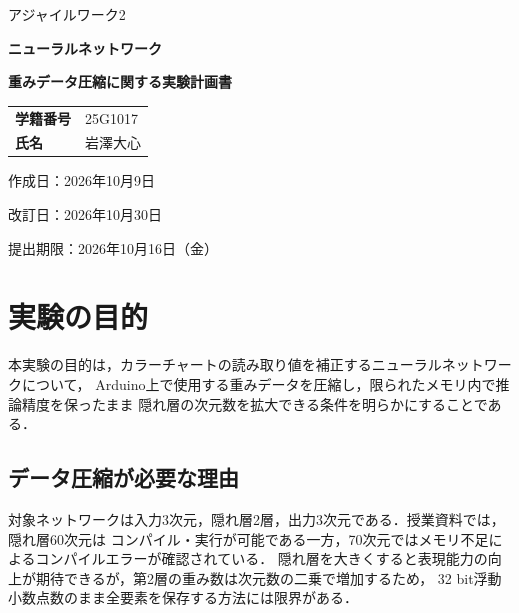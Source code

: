 \documentclass[a4paper,11pt]{article}
\newcommand{\StudentID}{25G1017}
\newcommand{\StudentName}{岩澤大心}
\begin{document}
\hypersetup{pageanchor=false}
\begin{titlepage}
  \centering
  \vspace*{22mm}
  {\Large アジャイルワーク2\par}
  \vspace{12mm}
  {\Huge\bfseries ニューラルネットワーク\par}
  \vspace{3mm}
  {\Huge\bfseries 重みデータ圧縮に関する実験計画書\par}
  \vspace{25mm}

  \begin{tabular}{>{\bfseries}p{38mm}p{90mm}}
    学籍番号 & \StudentID \\
    氏名     & \StudentName \\
  \end{tabular}

  \vfill
  {\large 作成日：2026年10月9日\par}
  \vspace{2mm}
  {\large 改訂日：2026年10月30日\par}
  \vspace{2mm}
  {\large 提出期限：2026年10月16日（金）\par}
\end{titlepage}

\hypersetup{pageanchor=true}
\tableofcontents
\clearpage
{}

\section{実験の目的}

本実験の目的は，カラーチャートの読み取り値を補正するニューラルネットワークについて，
Arduino上で使用する重みデータを圧縮し，限られたメモリ内で推論精度を保ったまま
隠れ層の次元数を拡大できる条件を明らかにすることである．

\subsection{データ圧縮が必要な理由}

対象ネットワークは入力3次元，隠れ層2層，出力3次元である．授業資料では，隠れ層60次元は
コンパイル・実行が可能である一方，70次元ではメモリ不足によるコンパイルエラーが確認されている．
隠れ層を大きくすると表現能力の向上が期待できるが，第2層の重み数は次元数の二乗で増加するため，
32 bit浮動小数点数のまま全要素を保存する方法には限界がある．
\end{document}
